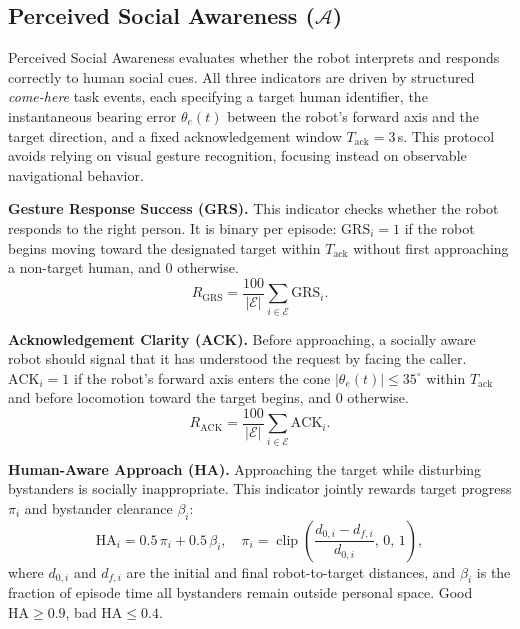 \documentclass[conference]{IEEEtran}
\begin{document}
\subsection{Perceived Social Awareness ($\mathcal{A}$)}

Perceived Social Awareness evaluates whether the robot interprets and responds
correctly to human social cues. All three indicators are driven by structured
\textit{come-here} task events, each specifying a target human identifier, the
instantaneous bearing error $\theta_e(t)$ between the robot's forward axis and
the target direction, and a fixed acknowledgement window $T_\text{ack} = 3$\,s.
This protocol avoids relying on visual gesture recognition, focusing instead
on observable navigational behavior.

\textbf{Gesture Response Success (GRS).}
This indicator checks whether the robot responds to the right person.
It is binary per episode: $\text{GRS}_i = 1$ if the robot begins moving toward
the designated target within $T_\text{ack}$ without first approaching a
non-target human, and $0$ otherwise.
\begin{equation}
  R_\text{GRS} = \frac{100}{|\mathcal{E}|}
    \sum_{i \in \mathcal{E}} \text{GRS}_i.
\end{equation}

\textbf{Acknowledgement Clarity (ACK).}
Before approaching, a socially aware robot should signal that it has
understood the request by facing the caller.
$\text{ACK}_i = 1$ if the robot's forward axis enters the cone
$|\theta_e(t)| \le 35^\circ$ within $T_\text{ack}$ and before locomotion
toward the target begins, and $0$ otherwise.
\begin{equation}
  R_\text{ACK} = \frac{100}{|\mathcal{E}|}
    \sum_{i \in \mathcal{E}} \text{ACK}_i.
\end{equation}

\textbf{Human-Aware Approach (HA).}
Approaching the target while disturbing bystanders is socially inappropriate.
This indicator jointly rewards target progress $\pi_i$ and bystander
clearance $\beta_i$:
\begin{equation}
  \text{HA}_i = 0.5\,\pi_i + 0.5\,\beta_i, \quad
  \pi_i = \operatorname{clip}\!\left(
    \frac{d_{0,i} - d_{f,i}}{d_{0,i}},\,0,\,1\right),
  \label{eq:ha}
\end{equation}
where $d_{0,i}$ and $d_{f,i}$ are the initial and final robot-to-target
distances, and $\beta_i$ is the fraction of episode time all bystanders
remain outside personal space.
Good $\text{HA} \ge 0.9$, bad $\text{HA} \le 0.4$.
\end{document}
